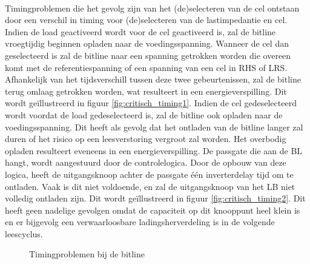 \paragraph{}
Timingproblemen die het gevolg zijn van het (de)selecteren van de cel ontstaan door een verschil in timing voor (de)selecteren van de lastimpedantie en cel. Indien de load geactiveerd wordt voor de cel geactiveerd is, zal de bitline vroegtijdig beginnen opladen naar de voedingsspanning. Wanneer de cel dan geselecteerd is zal de bitline naar een spanning getrokken worden die overeen komt met de referentiespanning of een spanning van een cel in RHS of LRS. Afhankelijk van het tijdsverschill tussen deze twee gebeurtenissen, zal de bitline terug omlaag getrokken worden, wat resulteert in een energieverspilling. Dit wordt geïllustreerd in figuur \ref{fig:critisch_timing1}. Indien de cel gedeselecteerd wordt voordat de load gedeselecteerd is, zal de bitline ook opladen naar de voedingsspanning. Dit heeft als gevolg dat het ontladen van de bitline langer zal duren of het risico op een leesverstoring vergroot zal worden. Het overbodig opladen resulteert eveneens in een energieverspilling. De passgate die aan de BL hangt, wordt aangestuurd door de controlelogica. Door de opbouw van deze logica, heeft de uitgangsknoop achter de passgate één inverterdelay tijd om te ontladen. Vaak is dit niet voldoende, en zal de uitgangsknoop van het LB niet volledig ontladen zijn. Dit wordt geïllustreerd in figuur \ref{fig:critisch_timing2}.   Dit heeft geen nadelige gevolgen omdat de capaciteit op dit knooppunt heel klein is en er bijgevolg een verwaarloosbare ladingsherverdeling is in de volgende leescyclus. 


\begin{figure}[ht]
\centering
{}
\caption[Timingproblemen bij de bitline]{Timingproblemen bij de bitline}
\clearpage
\end{figure}

